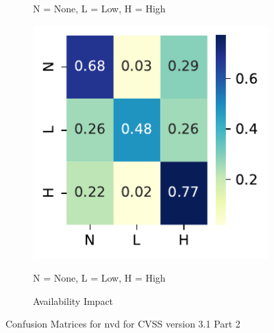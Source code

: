 \documentclass[12pt]{article}
\begin{document}
\begin{figure}
\begin{subfigure}[t]{0.45\textwidth}
		\begin{tablenotes}
			\footnotesize
			\item \quad N = None, L = Low, H = High
		\end{tablenotes}
	\end{subfigure}
	\hfill
	\begin{subfigure}[t]{0.45\textwidth}
		\includegraphics[width=\textwidth]{./figures/confusion_matrices/availability_impact_nvd.pdf}
		\caption{Availability Impact}

		\begin{tablenotes}
			\footnotesize
			\item \quad N = None, L = Low, H = High
		\end{tablenotes}
	\end{subfigure}

	\caption{\label{fig:nvd_31_confusion_matrices_2}Confusion Matrices for nvd for CVSS version 3.1 Part 2}
\end{figure}


\end{document}
